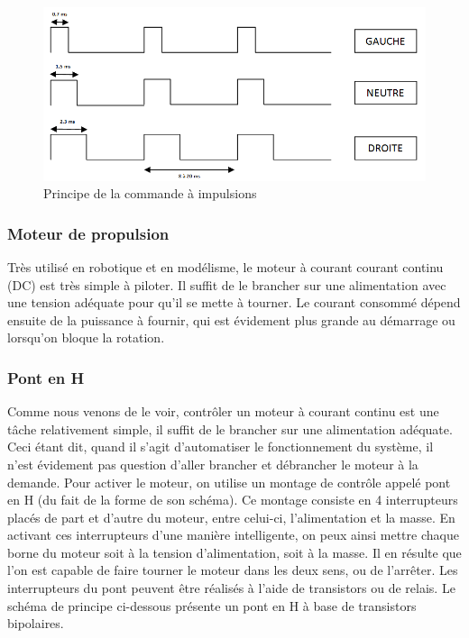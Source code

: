 \documentclass[a4paper,12pt]{report}
\begin{document}
\begin{figure}%
	\begin{center}
		\includegraphics[scale=0.75]{images/pwm.png}
	\end{center}
	\caption{Principe de la commande à impulsions} 
	\label{pwm}
\end{figure}
			
			\subsubsection{Moteur de propulsion}
			Très utilisé en robotique et en modélisme, le moteur à courant courant continu (DC) est très simple à piloter. Il suffit de le brancher sur une alimentation avec une tension adéquate pour qu’il se mette à tourner. Le courant consommé dépend ensuite de la puissance à fournir, qui est évidement plus grande au démarrage ou lorsqu’on bloque la rotation.
			
			\subsubsection{Pont en H}
			Comme nous venons de le voir, contrôler un moteur à courant continu est une tâche relativement simple, il suffit de le brancher sur une alimentation adéquate. Ceci étant dit, quand il s’agit d’automatiser le fonctionnement du système, il n’est évidement pas question d’aller brancher et débrancher le moteur à la demande.
Pour activer le moteur, on utilise un montage de contrôle appelé pont en H (du fait de la forme de son schéma). Ce montage consiste en 4 interrupteurs placés de part et d’autre du moteur, entre celui-ci, l’alimentation et la masse. En activant ces interrupteurs d’une manière intelligente, on peux ainsi mettre chaque borne du moteur soit à la tension d’alimentation, soit à la masse. Il en résulte que l’on est capable de faire tourner le moteur dans les deux sens, ou de l’arrêter.
Les interrupteurs du pont peuvent être réalisés à l’aide de transistors ou de relais. Le  schéma de principe ci-dessous présente un pont en H à base de transistors bipolaires.
\end{document}
